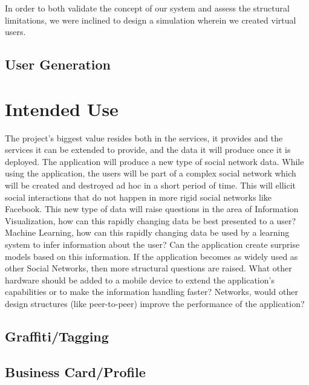 \documentclass[11pt]{article}
\begin{document}
In order to both validate the concept of our system and assess the structural limitations, we were inclined to design a simulation wherein we created virtual users.

\subsection{User Generation}







\section{Intended Use}



{\color{red} 
The project's biggest value resides both in the services, it provides and the services it can be extended to provide, and the data it will produce once it is deployed. The application will produce a new type of social network data. While using the application, the users will be part of a complex social network which will be created and destroyed ad hoc in a short period of time. This will ellicit social interactions that do not happen in more rigid social networks like Facebook. This new type of data will raise questions in the area of Information Visualization, how can this rapidly changing data be best presented to a user? Machine Learning, how can this rapidly changing data be used by a learning system to infer information about the user? Can the application create surprise models based on this information. If the application becomes as widely used as other Social Networks, then more structural questions are raised. What other hardware should be added to a mobile device to extend the application's capabilities or to make the information handling faster? Networks, would other design structures (like peer-to-peer) improve the performance of the application?
}

\subsection{Graffiti/Tagging}

\subsection{Business Card/Profile}
\end{document}
